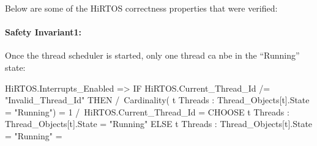 \documentclass[sigplan,anonymous,10pt]{acmart}
\begin{document}
Below are some of the HiRTOS correctness properties that were
verified:

\paragraph{Safety Invariant1:} Once the thread scheduler 
is started, only one thread ca nbe in the ``Running'' state:
\begin{tla}
 HiRTOS.Interrupts_Enabled =>
  IF HiRTOS.Current_Thread_Id /= "Invalid_Thread_Id"
  THEN
     /\ Cardinality(
         {t \in Threads : 
          Thread_Objects[t].State = "Running"}) = 1
     /\ HiRTOS.Current_Thread_Id =
         CHOOSE t \in Threads : 
            Thread_Objects[t].State = "Running"
  ELSE
     {t \in Threads : 
      Thread_Objects[t].State = "Running"} = {}
\end{tla}
\begin{tlatex}
%
%
%
%
%
%
%
%
%
%
\end{tlatex}
\end{document}
